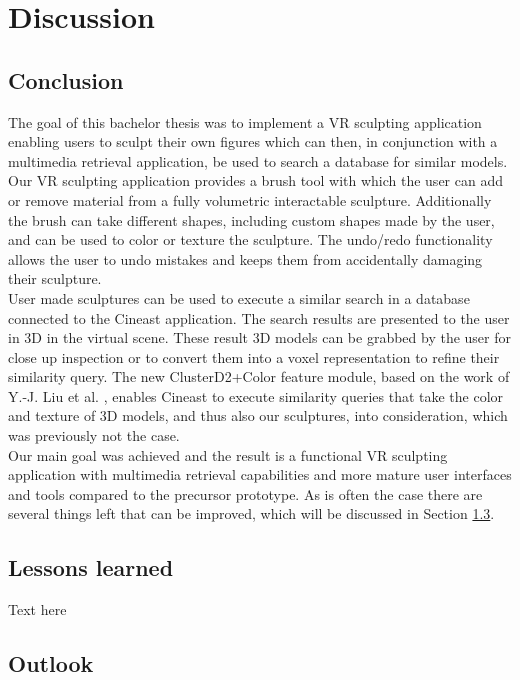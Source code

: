 \chapter{Discussion}

\section{Conclusion}

The goal of this bachelor thesis was to implement a VR sculpting application enabling users to sculpt their own figures which can then, in conjunction with a multimedia retrieval application, be used to search a database for similar models.\\
Our VR sculpting application provides a brush tool with which the user can add or remove material from a fully volumetric interactable sculpture. Additionally the brush can take different shapes, including custom shapes made by the user, and can be used to color or texture the sculpture. The undo/redo functionality allows the user to undo mistakes and keeps them from accidentally damaging their sculpture.\\
User made sculptures can be used to execute a similar search in a database connected to the Cineast application. The search results are presented to the user in 3D in the virtual scene. These result 3D models can be grabbed by the user for close up inspection or to convert them into a voxel representation to refine their similarity query. The new ClusterD2+Color feature module, based on the work of Y.-J. Liu et al. \cite{cluster_d2_color}, enables Cineast to execute similarity queries that take the color and texture of 3D models, and thus also our sculptures, into consideration, which was previously not the case.\\
Our main goal was achieved and the result is a functional VR sculpting application with multimedia retrieval capabilities and more mature user interfaces and tools compared to the precursor prototype. As is often the case there are several things left that can be improved, which will be discussed in Section \ref{sec:future_work}.


\section{Lessons learned}

Text here

\section{Outlook}
\label{sec:future_work}

